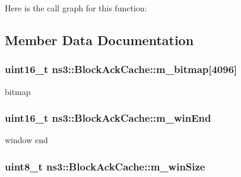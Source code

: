 Here is the call graph for this function\+:




\subsection{Member Data Documentation}
\subsubsection[{\texorpdfstring{m\+\_\+bitmap}{m_bitmap}}]{\setlength{\rightskip}{0pt plus 5cm}uint16\+\_\+t ns3\+::\+Block\+Ack\+Cache\+::m\+\_\+bitmap\mbox{[}4096\mbox{]}\hspace{0.3cm}{\ttfamily [private]}}\hypertarget{classns3_1_1BlockAckCache_adb1f98382f23dc2cde731c9d4ddc4d6a}{}\label{classns3_1_1BlockAckCache_adb1f98382f23dc2cde731c9d4ddc4d6a}


bitmap 

\subsubsection[{\texorpdfstring{m\+\_\+win\+End}{m_winEnd}}]{\setlength{\rightskip}{0pt plus 5cm}uint16\+\_\+t ns3\+::\+Block\+Ack\+Cache\+::m\+\_\+win\+End\hspace{0.3cm}{\ttfamily [private]}}\hypertarget{classns3_1_1BlockAckCache_ad4e4e1d170e58228b784ce9e4dda90db}{}\label{classns3_1_1BlockAckCache_ad4e4e1d170e58228b784ce9e4dda90db}


window end 

\subsubsection[{\texorpdfstring{m\+\_\+win\+Size}{m_winSize}}]{\setlength{\rightskip}{0pt plus 5cm}uint8\+\_\+t ns3\+::\+Block\+Ack\+Cache\+::m\+\_\+win\+Size\hspace{0.3cm}{\ttfamily [private]}}\hypertarget{classns3_1_1BlockAckCache_a5470178ccc3e62bd726eddf977a4cb00}{}\label{classns3_1_1BlockAckCache_a5470178ccc3e62bd726eddf977a4cb00}


